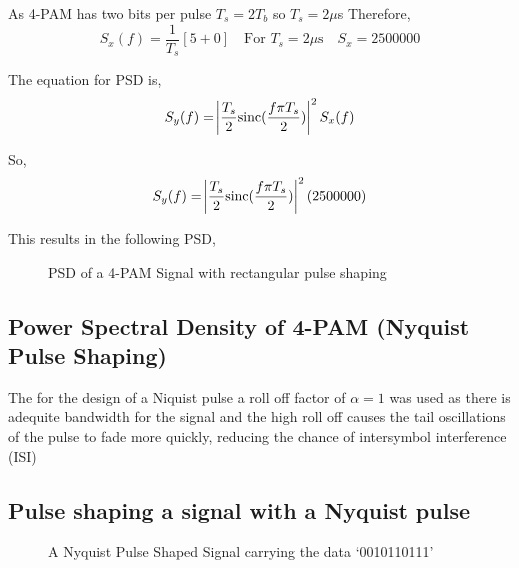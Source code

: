 As 4-PAM has two bits per pulse $T_s = 2 T_b$ so $T_s = 2 \mu$s Therefore,
\begin{equation}
    \label{eqn:sx-real}
    S_x(f) = \frac{1}{T_s} [5 + 0] \quad \textrm{For $T_s = 2\mu$s} \quad S_x=2500000
\end{equation}

The equation for PSD is,
\begin{equation}
    \label{eqn:PSD-4-PAM-rect}
    S_y(f) = \abs{\frac{T_s}{2} \textrm{sinc} ( \frac{f \pi T_s}{2} )}^2 S_x(f)
\end{equation}

So,
\begin{equation}
    \label{eqn:sy-value}
    S_y(f) = \abs{\frac{T_s}{2} \textrm{sinc}({\frac{f \pi T_s}{2}})}^2 (2500000)
\end{equation}
    
This results in the following PSD,
\begin{figure}[h]
    \begin{center}
        
        \caption{PSD of a 4-PAM Signal with rectangular pulse shaping}
    \end{center}
\end{figure}

\subsection{Power Spectral Density of 4-PAM (Nyquist Pulse Shaping)}
The for the design of a Niquist pulse a roll off factor of $\alpha = 1$ was used as there is adequite bandwidth
for the signal and the high roll off causes the tail oscillations of the pulse to fade more quickly, reducing the
chance of intersymbol interference (ISI)

\subsection{Pulse shaping a signal with a Nyquist pulse}

\begin{figure}
    \begin{center}
        
    \end{center}
    \caption{A Nyquist Pulse Shaped Signal carrying the data `0010110111'}
\end{figure}


    